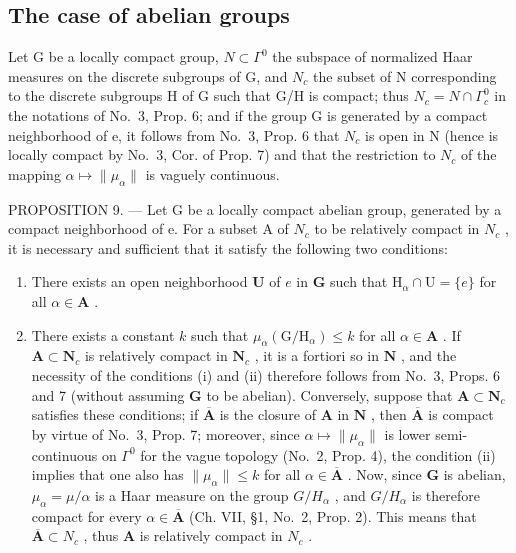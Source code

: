 \subsection{The case of abelian groups}

Let G be a locally compact group, \(N \subset \Gamma^{0}\) the subspace of normalized Haar measures on the discrete subgroups of G, and \(N_{c}\) the subset of N corresponding to the discrete subgroups H of G such that G/H is compact; thus \(N_{c} = N \cap \Gamma_{c}^{0}\) in the notations of No.~3, Prop. 6; and if the group G is generated by a compact neighborhood of e, it follows from No.~3, Prop. 6 that \(N_{c}\) is open in N (hence is locally compact by No.~3, Cor. of Prop. 7) and that the restriction to \(N_{c}\) of the mapping \(\alpha \mapsto \|\mu_{\alpha}\|\) is vaguely continuous.

PROPOSITION 9. --- Let G be a locally compact abelian group, generated by a compact neighborhood of e. For a subset A of \(N_{c}\) to be relatively compact in \(N_{c}\) , it is necessary and sufficient that it satisfy the following two conditions:

\begin{enumerate}
\def\labelenumi{(\roman{enumi})}
\item
  There exists an open neighborhood \(\mathbf{U}\) of \(e\) in \(\mathbf{G}\) such that \(\mathrm{H}_{\alpha} \cap \mathrm{U} = \{e\}\) for all \(\alpha \in \mathbf{A}\) .
\item
  There exists a constant \(k\) such that \(\mu_{\alpha}(\mathrm{G} / \mathrm{H}_{\alpha}) \leqslant k\) for all \(\alpha \in \mathbf{A}\) . If \(\mathbf{A} \subset \mathbf{N}_c\) is relatively compact in \(\mathbf{N}_c\) , it is a fortiori so in \(\mathbf{N}\) , and the necessity of the conditions (i) and (ii) therefore follows from No.~3, Props. 6 and 7 (without assuming \(\mathbf{G}\) to be abelian). Conversely, suppose that \(\mathbf{A} \subset \mathbf{N}_c\) satisfies these conditions; if \(\overline{\mathbf{A}}\) is the closure of \(\mathbf{A}\) in \(\mathbf{N}\) , then \(\overline{\mathbf{A}}\) is compact by virtue of No.~3, Prop. 7; moreover, since \(\alpha \mapsto \| \mu_{\alpha} \|\) is lower semi-continuous on \(\Gamma^0\) for the vague topology (No.~2, Prop. 4), the condition (ii) implies that one also has \(\| \mu_{\alpha} \| \leqslant k\) for all \(\alpha \in \overline{\mathbf{A}}\) . Now, since \(\mathbf{G}\) is abelian, \(\mu_{\alpha} = \mu / \alpha\) is a Haar measure on the group \(G / H_{\alpha}\) , and \(G / H_{\alpha}\) is therefore compact for every \(\alpha \in \overline{\mathbf{A}}\) (Ch. VII, §1, No.~2, Prop. 2). This means that \(\overline{\mathbf{A}} \subset N_c\) , thus \(\mathbf{A}\) is relatively compact in \(N_c\) .
\end{enumerate}

